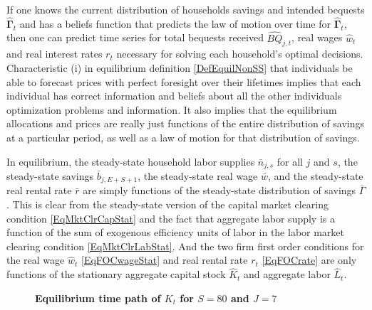 \begin{spacing}{1.5}
    If one knows the current distribution of households savings and intended bequests $\bm{\hat{\Gamma}}_t$ and has a beliefs function that predicts the law of motion over time for $\bm{\hat{\Gamma}}_t$, then one can predict time series for total bequests received $\hat{BQ}_{j,t}$, real wages $\hat{w}_t$ and real interest rates $r_t$ necessary for solving each household's optimal decisions. Characteristic (i) in equilibrium definition \ref{DefEquilNonSS} that individuals be able to forecast prices with perfect foresight over their lifetimes implies that each individual has correct information and beliefs about all the other individuals optimization problems and information. It also implies that the equilibrium allocations and prices are really just functions of the entire distribution of savings at a particular period, as well as a law of motion for that distribution of savings.

    In equilibrium, the steady-state household labor supplies $\bar{n}_{j,s}$ for all $j$ and $s$, the steady-state savings $\bar{b}_{j,E+S+1}$, the steady-state real wage $\bar{w}$, and the steady-state real rental rate $\bar{r}$ are simply functions of the steady-state distribution of savings $\bar{\Gamma}$. This is clear from the steady-state version of the capital market clearing condition \eqref{EqMktClrCapStat} and the fact that aggregate labor supply is a function of the sum of exogenous efficiency units of labor in the labor market clearing condition \eqref{EqMktClrLabStat}. And the two firm first order conditions for the real wage $\hat{w}_t$ \eqref{EqFOCwageStat} and real rental rate $r_t$ \eqref{EqFOCrate} are only functions of the stationary aggregate capital stock $\hat{K}_t$ and aggregate labor $\hat{L}_t$.

    \begin{figure}[htb]\centering \captionsetup{width=4.0in}
      \caption{\label{FigKpathTPI}\textbf{Equilibrium time path of $K_t$ for $S=80$ and $J=7$}}
    \end{figure}


\end{spacing}

